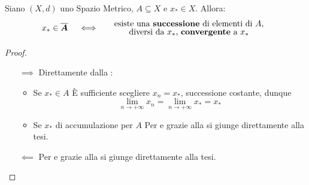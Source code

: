 \begin{corollary}
	\label{coro:succ_conv_sse_x_in_chius_A}
	Siano $(X,d)$ uno Spazio Metrico, $A \subseteq X$ e $x_* \in X$. Allora:
	\[
		x_* \in \boldsymbol{\overline{A}}
		\quad \iff \quad
		\begin{tabular}{c}
			esiste una \textbf{successione} di elementi di $A$,\\[-.5ex]
			diversi da $x_*$, \textbf{convergente} a $x_*$
		\end{tabular}
	\]
	\begin{proof}~
		\begin{itemize}
			\item[$\implies$] Direttamente dalla :
				\begin{itemize}
					\item Se $x_* \in A$\newline
						È sufficiente scegliere $x_n = x_*$, successione costante, dunque
						\[\lim\limits_{n \to +\infty} x_n = \lim\limits_{n \to +\infty} x_* = x_*\]
					\item Se $x_*$ di accumulazione per $A$\newline
						Per  e grazie alla  si giunge direttamente alla tesi.
				\end{itemize}
			\item[$\impliedby$] Per  e grazie alla  si giunge direttamente alla tesi.
		\end{itemize}
	\end{proof}
\end{corollary}

